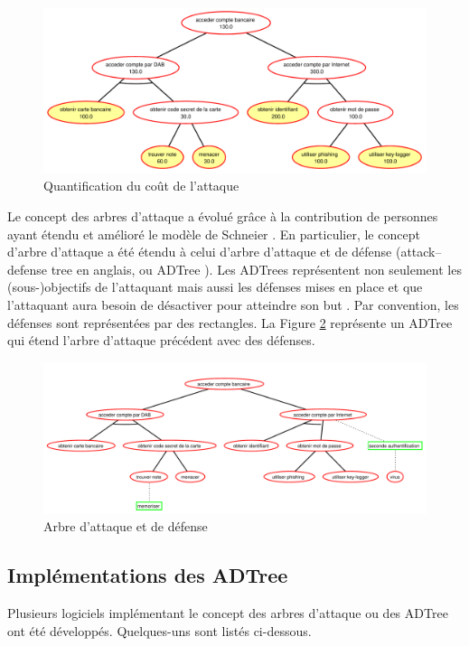         \begin{figure}[h]
	        \centering
	        \includegraphics[width=1\textwidth]{figure/quantification.pdf}
	        \caption{Quantification du coût de l'attaque}
	        \label{fig:arbre_exemple_2}
        \end{figure}

		Le concept des arbres d'attaque a évolué grâce à la contribution de personnes ayant étendu et amélioré le modèle de Schneier \cite{ADTreeKordy}. En particulier, le concept d'arbre d'attaque a été étendu à celui d’arbre d’attaque et de défense (\og attack–defense tree \fg{} en anglais, ou \og ADTree \fg{}). Les ADTrees représentent non seulement les (sous-)objectifs de l'attaquant mais aussi les défenses mises en place et que l'attaquant aura besoin de désactiver pour atteindre son but \cite{ADTreeOxford}. Par convention, les défenses sont représentées par des rectangles. La Figure \ref{fig:arbre_exemple_3} représente un ADTree qui étend l'arbre d'attaque précédent avec des défenses.

        \begin{figure}[h]
	        \centering
	        \includegraphics[width=1\textwidth]{figure/exemple2_rapport.pdf}
	        \caption{Arbre d'attaque et de défense}
	        \label{fig:arbre_exemple_3}
        \end{figure}

	\subsection{Implémentations des ADTree}
		Plusieurs logiciels implémentant le concept des arbres d'attaque ou des ADTree ont été développés. Quelques-uns sont listés ci-dessous.
        
